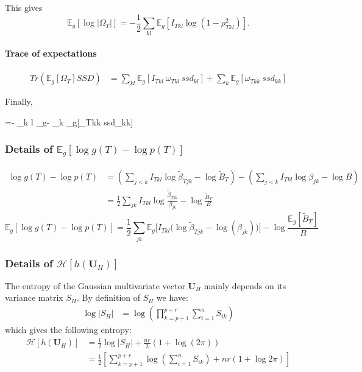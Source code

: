 \documentclass[11pt,a4paper]{article}
\newcommand*\lesswidefbox[1]{\fbox{\hspace{2em}#1\hspace{2em}}}
\newcommand{\entr}{\mathcal{H}}
\newcommand{\Ubf}{\boldsymbol{U}}
\newcommand{\Esp}{\mathds{E}}
\begin{document}
 This gives $$ \Esp_g[\log|\Omega_T|]=-\frac{1}{2}\sum_{kl} \Esp_g[ I_{Tkl}\log(1-\rho_{Tkl}^2)].$$
\paragraph{Trace of expectations\\}
 
\begin{align*}
Tr(\Esp_g[\Omega_T] SSD) &= \sum_{kl} \Esp_g[I_{Tkl}\: \omega_{Tkl\:}ssd_{kl}] + \sum_k \Esp_g[\omega_{Tkk}\: ssd_{kk}] 
\end{align*}

Finally, 
\begin{empheq}[box=\lesswidefbox]{align*}
\Esp_{gh} [\log p(\Ubf \mid T)] =-  \sum _{k \neq l} \Esp_g -  \sum_k \Esp_g[\omega_{Tkk}\: ssd_{kk}] 
 \end{empheq}

\subsubsection{Details of $\Esp_g[\log g(T) - \log p(T)]$}
\begin{align*}
\log g(T) - \log p(T) &= \left(  \sum_{j<k}I_{Tkl}\log \widetilde{\beta}_{Tjk} - \log \widetilde{B}_T\right) - \left(  \sum_{j<k} I_{Tkl}\log {\beta}_{jk} - \log {B}\right)\\
&=\frac{1}{2}\sum_{jk} I_{Tkl}\log \frac{\widetilde{\beta}_{Tjk}}{{\beta}_{jk}} - \log \frac{\widetilde{B}_T}{B}
\end{align*}
$$\boxed{
\Esp_g[\log g(T) - \log p(T)] = \frac{1}{2}\sum_{jk} \Esp_g\Big[I_{Tkl} \big(\log \widetilde{\beta}_{Tjk}-\log(\beta_{jk})\big)\Big] - \log \frac{\Esp_g[\widetilde{B}_T]}{B} }$$

 \subsubsection{Details of $\entr[h(\Ubf_H)]$}
 
 The entropy of the Gaussian multivariate vector $\Ubf_H$ mainly depends on its variance matrix $S_H$. By definition of $S_H$ we have:
 \begin{align*}
 \log |S_H| &= \log(\prod_{k=p+1}^{p+r} \sum_{i=1}^n S_{ik})
\end{align*}
which gives the following entropy:
\begin{align*}
\entr[h(\Ubf_H)]&= \frac{1}{2} \log |S_H| + \frac{nr}{2}(1+\log(2\pi))\\
 &=\frac{1}{2}\left[ \sum_{k=p+1}^{p+r} \log\left(\sum_{i=1}^n S_{ik}\right)+ nr(1+\log 2\pi )\right]
\end{align*}
\end{document}
